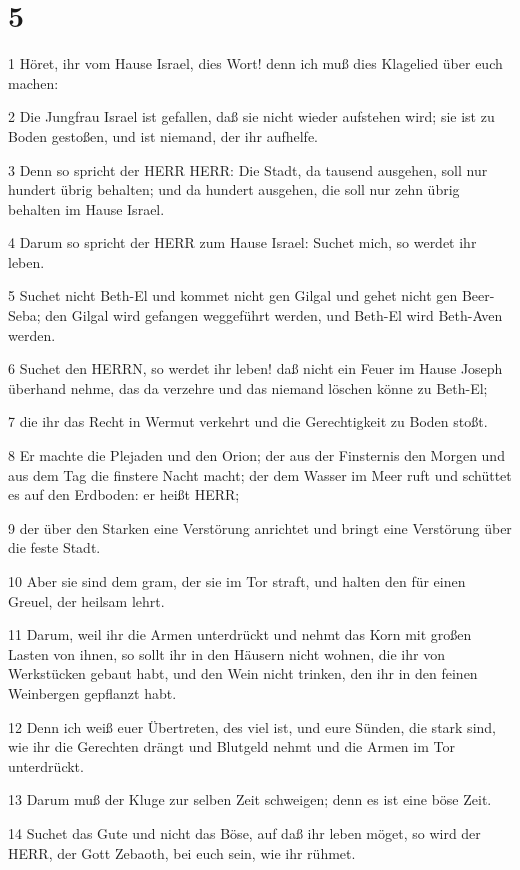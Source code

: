 \chapter{5}

\par 1 Höret, ihr vom Hause Israel, dies Wort! denn ich muß dies Klagelied über euch machen:
\par 2 Die Jungfrau Israel ist gefallen, daß sie nicht wieder aufstehen wird; sie ist zu Boden gestoßen, und ist niemand, der ihr aufhelfe.
\par 3 Denn so spricht der HERR HERR: Die Stadt, da tausend ausgehen, soll nur hundert übrig behalten; und da hundert ausgehen, die soll nur zehn übrig behalten im Hause Israel.
\par 4 Darum so spricht der HERR zum Hause Israel: Suchet mich, so werdet ihr leben.
\par 5 Suchet nicht Beth-El und kommet nicht gen Gilgal und gehet nicht gen Beer-Seba; den Gilgal wird gefangen weggeführt werden, und Beth-El wird Beth-Aven werden.
\par 6 Suchet den HERRN, so werdet ihr leben! daß nicht ein Feuer im Hause Joseph überhand nehme, das da verzehre und das niemand löschen könne zu Beth-El;
\par 7 die ihr das Recht in Wermut verkehrt und die Gerechtigkeit zu Boden stoßt.
\par 8 Er machte die Plejaden und den Orion; der aus der Finsternis den Morgen und aus dem Tag die finstere Nacht macht; der dem Wasser im Meer ruft und schüttet es auf den Erdboden: er heißt HERR;
\par 9 der über den Starken eine Verstörung anrichtet und bringt eine Verstörung über die feste Stadt.
\par 10 Aber sie sind dem gram, der sie im Tor straft, und halten den für einen Greuel, der heilsam lehrt.
\par 11 Darum, weil ihr die Armen unterdrückt und nehmt das Korn mit großen Lasten von ihnen, so sollt ihr in den Häusern nicht wohnen, die ihr von Werkstücken gebaut habt, und den Wein nicht trinken, den ihr in den feinen Weinbergen gepflanzt habt.
\par 12 Denn ich weiß euer Übertreten, des viel ist, und eure Sünden, die stark sind, wie ihr die Gerechten drängt und Blutgeld nehmt und die Armen im Tor unterdrückt.
\par 13 Darum muß der Kluge zur selben Zeit schweigen; denn es ist eine böse Zeit.
\par 14 Suchet das Gute und nicht das Böse, auf daß ihr leben möget, so wird der HERR, der Gott Zebaoth, bei euch sein, wie ihr rühmet.

